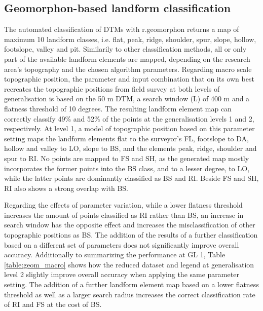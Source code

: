 \documentclass[preprint,12pt,authoryear]{elsarticle}
\begin{document}
\subsection{Geomorphon-based landform classification}
The automated classification of DTMs with r.geomorphon returns a map of maximum 10 landform classes, i.e. flat, peak, ridge, shoulder, spur, slope, hollow, footslope, valley and pit. Similarily to other classification methods, all or only part of the available landform elements are mapped, depending on the research area's topography and the chosen algorithm parameters. 
Regarding macro scale topographic position, the parameter and input combination that on its own best recreates the topographic positions from field survey at both levels of generalisation is based on the 50 m DTM, a search window (L) of 400 m and a flatness threshold of 10 degrees. The resulting landform element map can correctly classify 49\% and 52\% of the points at the generalisation levels 1 and 2, respectively. At level 1, a model of topographic position based on this parameter setting maps the landform elements flat to the surveyor's FL, footslope to DA,  hollow and valley to LO, slope to BS, and the elements peak, ridge, shoulder and spur to RI. No points are mapped to FS and SH, as the generated map mostly incorporates the former points into the BS class, and to a lesser degree, to LO, while the latter points are dominantly classified as BS and RI. Beside FS  and SH, RI also shows a strong overlap with BS.

Regarding the effects of parameter variation, while a lower flatness threshold increases the amount of points classified as RI rather than BS, an increase in search window has the opposite effect and increases the misclassification of other topographic positions as BS. The addition of the results of a further classification based on a different set of parameters does not significantly improve overall accuracy. 
Additionally to summarizing the performance at GL 1, Table \ref{table:geom_macro} shows how the reduced dataset and legend at generalisation level 2 slightly improve overall accuracy when applying the same parameter setting. The addition of a further landform element map based on a lower flatness threshold as well as a larger search radius increases the correct classification rate of RI and FS at the cost of BS.
\end{document}
